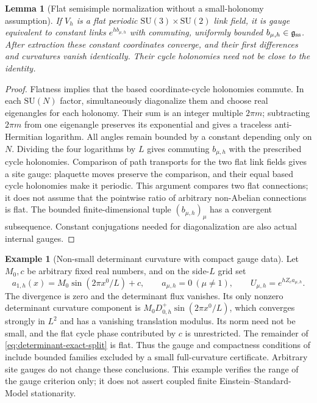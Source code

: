 \documentclass[11pt]{article}
\numberwithin{equation}{section}
\newtheorem{lemma}[lemma]{Lemma}
\theoremstyle{definition}
\newtheorem{example}[example]{Example}
\theoremstyle{remark}
\newcommand{\SU}{\mathrm{SU}}
\begin{document}
\begin{lemma}[Flat semisimple normalization without a small-holonomy assumption]
\label{lem:flat-semisimple-normalization}
If $V_h$ is a flat periodic $\SU(3)\times\SU(2)$ link field, it is gauge
equivalent to constant links $e^{h b_{\mu,h}}$ with commuting, uniformly
bounded $b_{\mu,h}\in\mathfrak g_{\rm ss}$.  After extraction these
constant coordinates converge, and their first differences and curvatures
vanish identically.  Their cycle holonomies need not be close to the
identity.
\end{lemma}
\begin{proof}
Flatness implies that the based coordinate-cycle holonomies commute.
In each $\SU(N)$ factor, simultaneously diagonalize them and choose real
eigenangles for each holonomy.  Their sum is an integer multiple $2\pi m$; subtracting $2\pi m$ from
one eigenangle preserves its exponential and gives a traceless
anti-Hermitian logarithm.  All angles remain bounded by a constant
depending only on $N$.  Dividing the four logarithms by $L$ gives
commuting $b_{\mu,h}$ with the prescribed cycle holonomies.  Comparison of
path transports for the two flat link fields gives a site gauge: plaquette
moves preserve the comparison, and their equal based cycle holonomies
make it periodic.  This argument compares two flat connections; it does
not assume that the pointwise ratio of arbitrary non-Abelian connections
is flat.  The bounded finite-dimensional tuple $(b_{\mu,h})_\mu$ has a
convergent subsequence.  Constant conjugations needed for diagonalization
are also actual internal gauges.
\end{proof}

\begin{example}[Non-small determinant curvature with compact gauge data]
\label{ex:determinant-large-field}
Let $M_0,c$ be arbitrary fixed real numbers, and on the side-$L$ grid set
\[
 a_{1,h}(x)=M_0\sin(2\pi x^0/L)+c,\qquad
 a_{\mu,h}=0\ (\mu\ne1),\qquad U_{\mu,h}=e^{hZ_ca_{\mu,h}}.
\]
The divergence is zero and the determinant flux vanishes.  Its only
nonzero determinant curvature component is
$M_0D^+_{0,h}\sin(2\pi x^0/L)$, which converges strongly in $L^2$ and
has a vanishing translation modulus.  Its norm need not be small, and the
flat cycle phase contributed by $c$ is unrestricted.  The remainder of
\eqref{eq:determinant-exact-split} is flat.  Thus the gauge and compactness
conditions of  include bounded
families excluded by a small full-curvature certificate.  Arbitrary site
gauges do not change these conclusions.  This example verifies the range
of the gauge criterion only; it does not assert coupled finite
Einstein--Standard-Model stationarity.
\end{example}
\end{document}
